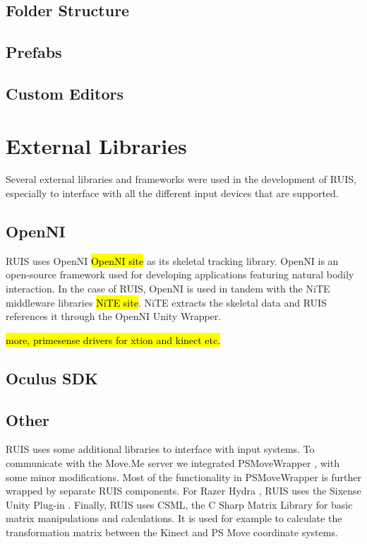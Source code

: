 \documentclass[12pt,a4paper,oneside,pdftex]{report}
\begin{document}
\subsection{Folder Structure}
\label{subsection:systemarchitecture:folderstructure}

\subsection{Prefabs}
\label{subsection:systemarchitecture:prefabs}

\subsection{Custom Editors}
\label{subsection:systemarchitecture:customeditors}

\section{External Libraries}
\label{section:externallibraries}

Several external libraries and frameworks were used in the development of RUIS, especially to interface with all the different input devices that are supported. 

\subsection{OpenNI}
\label{subsection:external:openni}

RUIS uses OpenNI \hl{OpenNI site} as its skeletal tracking library. OpenNI is an open-source framework used for developing applications featuring natural bodily interaction. In the case of RUIS, OpenNI is used in tandem with the NiTE middleware libraries \hl{NiTE site}. NiTE extracts the skeletal data and RUIS references it through the OpenNI Unity Wrapper. 

\hl{more, primesense drivers for xtion and kinect etc.}

\subsection{Oculus SDK}
\label{subsection:external:oculussdk}

\subsection{Other}
\label{subsection:external:other}

RUIS uses some additional libraries to interface with input systems. To communicate with the Move.Me server we integrated PSMoveWrapper \cite{PSMoveWrapper}, with some minor modifications. Most of the functionality in PSMoveWrapper is further wrapped by separate RUIS components. For Razer Hydra \cite{RazerHydra}, RUIS uses the Sixense Unity Plug-in \cite{RazerUnityPlugin}. Finally, RUIS uses CSML, the C Sharp Matrix Library for basic matrix manipulations and calculations. It is used for example to calculate the transformation matrix between the Kinect and PS Move coordinate systems.
\end{document}
